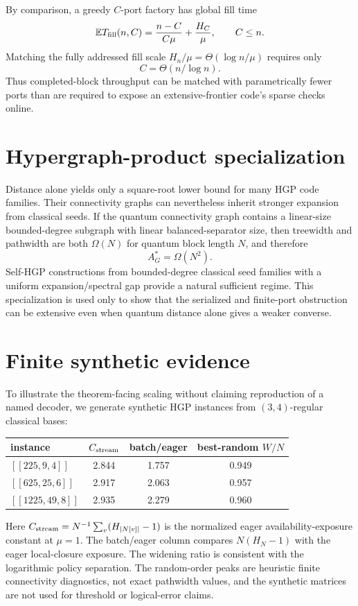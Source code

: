 \documentclass[aps,prx,reprint,superscriptaddress,nofootinbib,longbibliography,floatfix]{revtex4-2}
\newcommand{\E}{\mathbb E}\newcommand{\Prob}{\mathbb P}
\begin{document}
By comparison, a greedy $C$-port factory has global fill time
\begin{equation}
\E T_{\rm fill}(n,C)=\frac{n-C}{C\mu}+\frac{H_C}{\mu},\qquad C\le n.
\end{equation}
Matching the fully addressed fill scale $H_n/\mu=\Theta(\log n/\mu)$ requires only
\begin{equation}
C=\Theta(n/\log n).
\end{equation}
Thus completed-block throughput can be matched with parametrically fewer ports than are required to expose an extensive-frontier code's sparse checks online.

\section{Hypergraph-product specialization}
Distance alone yields only a square-root lower bound for many HGP code families. Their connectivity graphs can nevertheless inherit stronger expansion from classical seeds. If the quantum connectivity graph contains a linear-size bounded-degree subgraph with linear balanced-separator size, then treewidth and pathwidth are both $\Omega(N)$ for quantum block length $N$, and therefore
\begin{equation}
A_G^*=\Omega(N^2).
\end{equation}
Self-HGP constructions from bounded-degree classical seed families with a uniform expansion/spectral gap provide a natural sufficient regime. This specialization is used only to show that the serialized and finite-port obstruction can be extensive even when quantum distance alone gives a weaker converse.

\section{Finite synthetic evidence}
To illustrate the theorem-facing scaling without claiming reproduction of a named decoder, we generate synthetic HGP instances from $(3,4)$-regular classical bases:
\begin{center}
\begin{tabular}{lccc}
\toprule
instance & $C_{\rm stream}$ & batch/eager & best-random $W/N$\\
\midrule
$[[225,9,4]]$ & 2.844 & 1.757 & 0.949\\
$[[625,25,6]]$ & 2.917 & 2.063 & 0.957\\
$[[1225,49,8]]$ & 2.935 & 2.279 & 0.960\\
\bottomrule
\end{tabular}
\end{center}
Here $C_{\rm stream}=N^{-1}\sum_v(H_{|N[v]|}-1)$ is the normalized eager availability-exposure constant at $\mu=1$. The batch/eager column compares $N(H_N-1)$ with the eager local-closure exposure. The widening ratio is consistent with the logarithmic policy separation. The random-order peaks are heuristic finite connectivity diagnostics, not exact pathwidth values, and the synthetic matrices are not used for threshold or logical-error claims.
\end{document}
